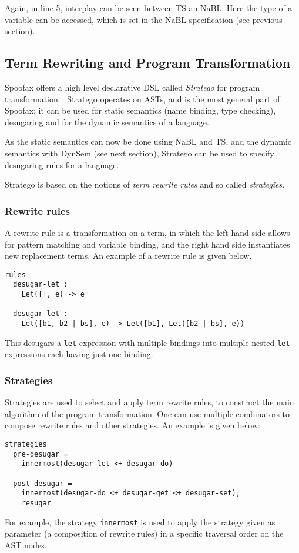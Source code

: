 Again, in line 5, interplay can be seen between TS an NaBL. Here the
type of a variable can be accessed, which is set in the NaBL
specification (see previous section).
\subsection{Term Rewriting and Program Transformation}
\label{sec-term-rewrite}
Spoofax offers a high level declarative DSL called \emph{Stratego} for
program transformation~\cite{Visser01}. Stratego operates on ASTs,
and is the most general part of Spoofax: it can be used for static
semantics (name binding, type checking), desugaring and for the
dynamic semantics of a language.

As the static semantics can now be done using NaBL and TS, and the
dynamic semantics with DynSem (see next section), Stratego can be used
to specify desugaring rules for a language.

Stratego is based on the notions of \emph{term rewrite rules} and so called
\emph{strategies}.
\subsubsection{Rewrite rules}
\label{sec:orgheadline5}
A rewrite rule is a transformation on a term, in which
the left-hand side allows for pattern matching and variable binding,
and the right hand side instantiates new replacement terms. An example
of a rewrite rule is given below.
\begin{verbatim}
rules
  desugar-let :
  	Let([], e) -> e

  desugar-let :
  	Let([b1, b2 | bs], e) -> Let([b1], Let([b2 | bs], e))
\end{verbatim}
This desugars a \texttt{let} expression with multiple bindings into multiple
nested \texttt{let} expressions each having just one binding.
\subsubsection{Strategies}
\label{sec:orgheadline6}
Strategies are used to select and apply term rewrite rules, to
construct the main algorithm of the program transformation. One can
use multiple combinators to compose rewrite rules and other
strategies. An example is given below:
\begin{verbatim}
strategies
  pre-desugar =
    innermost(desugar-let <+ desugar-do)

  post-desugar =
    innermost(desugar-do <+ desugar-get <+ desugar-set);
    resugar
\end{verbatim}
For example, the strategy \texttt{innermost} is used to apply the strategy
given as parameter (a composition of rewrite rules) in a specific
traversal order on the AST nodes.
